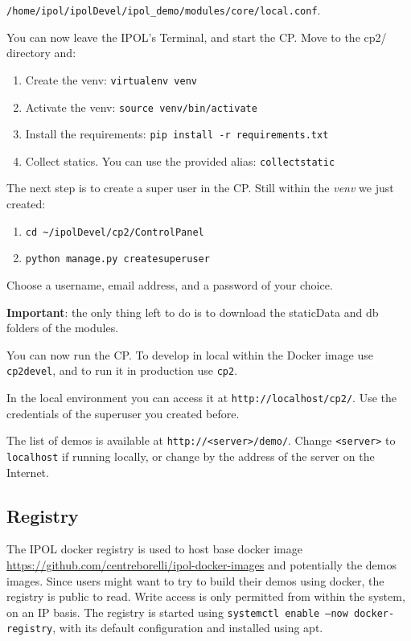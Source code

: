 \documentclass[a4paper,12pt]{article}
\begin{document}
{\tt /home/ipol/ipolDevel/ipol\_demo/modules/core/local.conf}.

You can now leave the IPOL's Terminal, and start the CP.
Move to the cp2/ directory and:

\begin{enumerate}
  \item Create the venv: {\tt virtualenv venv}
  \item Activate the venv: {\tt source venv/bin/activate}
  \item Install the requirements: {\tt pip install -r requirements.txt}
  \item Collect statics. You can use the provided alias: {\tt collectstatic}
\end{enumerate}

The next step is to create a super user in the CP. Still within the \emph{venv} we just created:
\begin{enumerate}
  \item {\tt cd \textasciitilde/ipolDevel/cp2/ControlPanel}
  \item {\tt python manage.py createsuperuser}
\end{enumerate}

Choose a username, email address, and a password of your choice.

\textbf{Important}: the only thing left to do is to download the staticData and db folders of the modules.

You can now run the CP. To develop in local within the Docker image use {\tt cp2devel}, and to run it in production use {\tt cp2}.

In the local environment you can access it at {\tt http://localhost/cp2/}. Use the credentials of the superuser you created
before.

The list of demos is available at {\tt http://<server>/demo/}. Change {\tt <server>} to {\tt localhost} if running locally, or change by the address of the server on the Internet.

\subsection{Registry}
The IPOL docker registry is used to host base docker image \url{https://github.com/centreborelli/ipol-docker-images} and potentially the demos images.
Since users might want to try to build their demos using docker, the registry is public to read. Write access is only permitted from within the system, on an IP basis.
The registry is started using {\tt systemctl enable --now docker-registry}, with its default configuration and installed using apt.
\end{document}
